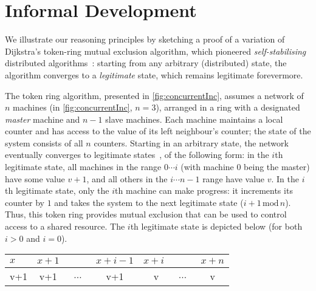 \section{Informal Development}
\label{sec:intuition}

We illustrate our \colosl reasoning principles by sketching a proof of
a variation of Dijkstra's token-ring mutual exclusion algorithm, which
pioneered \emph{self-stabilising} distributed
algorithms~\cite{dijkstra74}: starting from any arbitrary
(distributed) state, the algorithm converges to a \emph{legitimate}
state, which remains legitimate forevermore.

The token ring algorithm, presented in \fig\ref{fig:concurrentInc},
assumes a network of $n$ machines (in \fig\ref{fig:concurrentInc},
$n=3$), arranged in a ring with a designated \emph{master} machine and
$n{-}1$ slave machines. Each machine maintains a local counter and has
access to the value of its left neighbour's counter; the state of the
system consists of all $n$ counters. Starting in an arbitrary state,
the network eventually converges to legitimate
states~\cite{dijkstra-proof}, of the following form: 
in the $i$th legitimate state, all machines in the range $0\cdots i$ (with machine $0$ being the master) have some value $v{+}1$, and all others in the $i \cdots n{-}1$ range have value $v$.  In the $i$th legitimate state, only the $i$th machine can make progress: it increments its counter by $1$ and takes the system to the next legitimate state ($i{+}1 \,\text{mod}\, n$). Thus, this token ring provides mutual exclusion that can be used to control access to a shared resource. The $i$th legitimate state is depicted below (for both $i>0$ and $i=0$).  \\ \null\hfill
  \begin{tabular}{lllllll}
    $x$&$x{+}1$&&$x{+}i{-}1$&$x{+}i$&&$x{+}n$
    \\
    \hline
    \multicolumn{1}{|c|}{v+1} &
    \multicolumn{1}{|c|}{v+1} &
    \multicolumn{1}{|c|}{~$\cdots$~} &
    \multicolumn{1}{|c|}{v+1} &
    \multicolumn{1}{|c|}{~~v~\raisebox{1ex}{$\bullet$}} &
    \multicolumn{1}{|c|}{~$\cdots$~} &
    \multicolumn{1}{|c|}{v}\\
    \hline
  \end{tabular}\hfill
